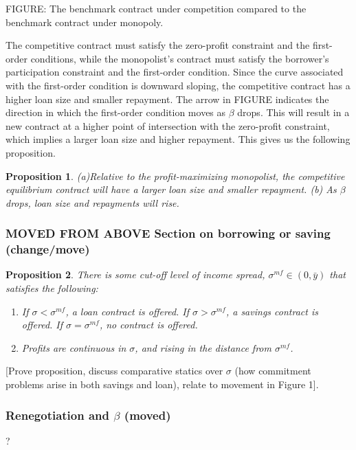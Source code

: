\documentclass[11pt]{article}%
\newtheorem{proposition}{Proposition}
\begin{document}
FIGURE: The benchmark contract under competition compared to the benchmark
contract under monopoly.


The competitive contract must satisfy the zero-profit constraint and the
first-order conditions, while the monopolist's contract must satisfy the
borrower's participation constraint and the first-order condition. Since the
curve associated with the first-order condition is downward sloping, the
competitive contract has a higher loan size and smaller repayment. The arrow
in FIGURE indicates the direction in which the first-order condition moves
as $\beta$ drops. This will result in a new contract at a higher point of
intersection with the zero-profit constraint, which implies a larger loan size
and higher repayment. This gives us the following proposition.

\begin{proposition}
(a)Relative to the profit-maximizing monopolist, the competitive equilibrium
contract will have a larger loan size and smaller repayment. (b) As $\beta$
drops, loan size and repayments will rise.
\end{proposition}


\subsubsection{MOVED FROM ABOVE Section on borrowing or saving (change/move)}


\begin{proposition}
There is some cut-off level of income spread, $\sigma^{mf}\in\left(  0,\bar
{y}\right)  $ that satisfies the following:

\begin{enumerate}
\item If $\sigma<\sigma^{mf}$, a loan contract is offered. If $\sigma
>\sigma^{mf}$, a savings contract is offered. If $\sigma=\sigma^{mf}$, no
contract is offered.

\item Profits are continuous in $\sigma$, and rising in the distance from
$\sigma^{mf}$.
\end{enumerate}
\end{proposition}

[Prove proposition, discuss comparative statics over $\sigma$ (how commitment
problems arise in both savings and loan), relate to movement in Figure 1].
\subsubsection{Renegotiation and $\beta $ (moved)}?
\end{document}
